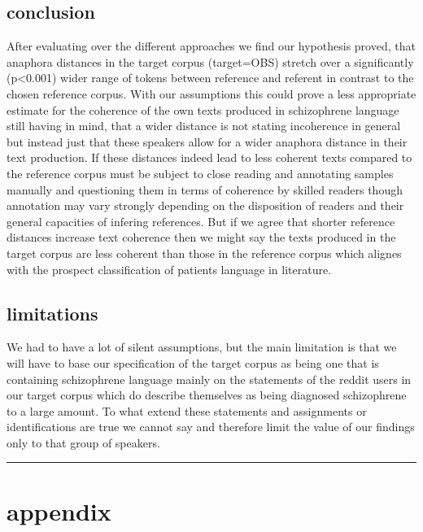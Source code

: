 \documentclass[
  12pt,
  oneside]{book}
\begin{document}
\section{conclusion}\label{conclusion}

After evaluating over the different approaches we find our hypothesis proved, that anaphora distances in the target corpus (target=OBS) stretch over a significantly (p\textless0.001) wider range of tokens between reference and referent in contrast to the chosen reference corpus. With our assumptions this could prove a less appropriate estimate for the coherence of the own texts produced in schizophrene language still having in mind, that a wider distance is not stating incoherence in general but instead just that these speakers allow for a wider anaphora distance in their text production. If these distances indeed lead to less coherent texts compared to the reference corpus must be subject to close reading and annotating samples manually and questioning them in terms of coherence by skilled readers though annotation may vary strongly depending on the disposition of readers and their general capacities of infering references. But if we agree that shorter reference distances increase text coherence then we might say the texts produced in the target corpus are less coherent than those in the reference corpus which alignes with the prospect classification of patients language in literature.

\section{limitations}\label{limitations}

We had to have a lot of silent assumptions, but the main limitation is that we will have to base our specification of the target corpus as being one that is containing schizophrene language mainly on the statements of the reddit users in our target corpus which do describe themselves as being diagnosed schizophrene to a large amount. To what extend these statements and assignments or identifications are true we cannot say and therefore limit the value of our findings only to that group of speakers.

\begin{center}\rule{0.5\linewidth}{0.5pt}\end{center}

\chapter{appendix}\label{appendix}
\end{document}
